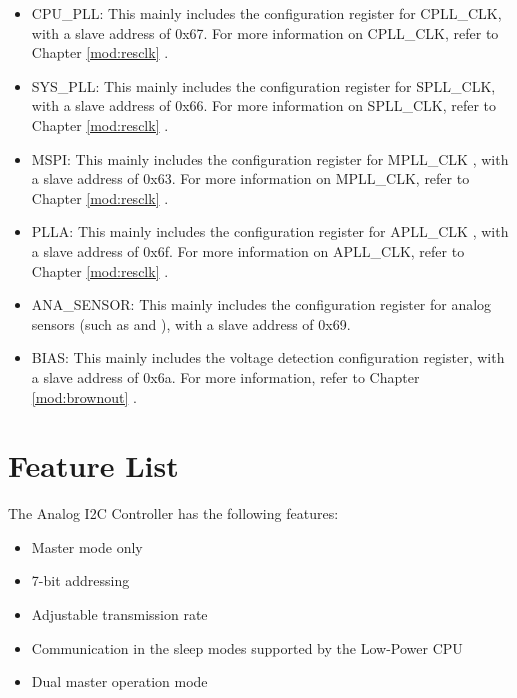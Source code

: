 \documentclass[main\_\_EN.tex]{subfiles}
\begin{document}
\begin{itemize}
    \item CPU\_PLL: This mainly includes the configuration register for CPLL\_CLK, with a slave address of 0x67. For more information on CPLL\_CLK, refer to Chapter \ref{mod:resclk} \textit{}.
    \item SYS\_PLL: This mainly includes the configuration register for SPLL\_CLK, with a slave address of 0x66. For more information on SPLL\_CLK, refer to Chapter \ref{mod:resclk} \textit{}.
    \item MSPI: This mainly includes the configuration register for MPLL\_CLK , with a slave address of 0x63. For more information on MPLL\_CLK, refer to Chapter \ref{mod:resclk} \textit{}.
    \item PLLA: This mainly includes the configuration register for APLL\_CLK , with a slave address of 0x6f. For more information on APLL\_CLK, refer to Chapter \ref{mod:resclk} \textit{}.
    \item ANA\_SENSOR: This mainly includes the configuration register for analog sensors (such as \textit{} and  \textit{}), with a slave address of 0x69.
    \item BIAS: This mainly includes the voltage detection configuration register, with a slave address of 0x6a. For more information, refer to Chapter \ref{mod:brownout} \textit{}.
\end{itemize}



\section{Feature List}
\label{sec:anai2c-features}

The Analog I2C Controller has the following features:

\begin{itemize}
    \item Master mode only
    \item 7-bit addressing
    \item Adjustable transmission rate
    \item Communication in the sleep modes supported by the Low-Power CPU
    \item Dual master operation mode
\end{itemize}
\end{document}
